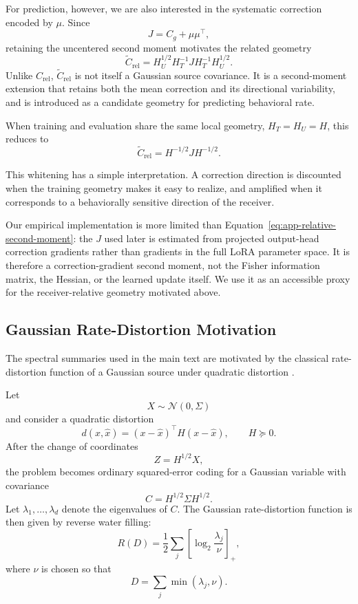 For prediction, however, we are also interested in the systematic correction
encoded by $\mu$. Since
\[
    J=C_g+\mu\mu^\top,
\]
retaining the uncentered second moment motivates the related geometry
\begin{equation}
    \widetilde C_{\mathrm{rel}}
    =
    H_U^{1/2}
    H_T^{-1}
    J
    H_T^{-1}
    H_U^{1/2}.
    \label{eq:app-relative-second-moment}
\end{equation}
Unlike $C_{\mathrm{rel}}$, $\widetilde C_{\mathrm{rel}}$ is not itself a
Gaussian source covariance. It is a second-moment extension that retains both
the mean correction and its directional variability, and is introduced as a
candidate geometry for predicting behavioral rate.

When training and evaluation share the same local geometry,
$H_T=H_U=H$, this reduces to
\begin{equation}
    \widetilde C_{\mathrm{rel}}
    =
    H^{-1/2}JH^{-1/2}.
    \label{eq:app-whitened-spectrum}
\end{equation}

This whitening has a simple interpretation.
A correction direction is discounted when the training geometry makes it easy
to realize, and amplified when it corresponds to a behaviorally sensitive
direction of the receiver.

Our empirical implementation is more limited than Equation~\ref{eq:app-relative-second-moment}: the $J$ used later is estimated from projected output-head correction gradients rather than gradients in the full LoRA parameter space.
It is therefore a correction-gradient second moment, not the Fisher information matrix, the Hessian, or the learned update itself.
We use it as an accessible proxy for the receiver-relative geometry motivated above.

\subsection{Gaussian Rate-Distortion Motivation}
\label{app:gaussian-rd}

The spectral summaries used in the main text are motivated by the classical
rate-distortion function of a Gaussian source under quadratic distortion
\citep[Ch.~10]{cover2006elements}.

Let
\[
    X\sim\mathcal{N}(0,\Sigma)
\]
and consider a quadratic distortion
\[
    d(x,\hat x)
    =
    (x-\hat x)^\top H(x-\hat x),
    \qquad H\succeq0.
\]
After the change of coordinates
\[
    Z=H^{1/2}X,
\]
the problem becomes ordinary squared-error coding for a Gaussian variable with
covariance
\[
    C=H^{1/2}\Sigma H^{1/2}.
\]
Let $\lambda_1,\ldots,\lambda_d$ denote the eigenvalues of $C$.
The Gaussian rate-distortion function is then given by reverse water filling:
\begin{equation}
    R(D)
    =
    \frac{1}{2}
    \sum_j
    \left[
        \log_2\frac{\lambda_j}{\nu}
    \right]_+,
    \label{eq:app-waterfilling}
\end{equation}
where $\nu$ is chosen so that
\[
    D
    =
    \sum_j\min(\lambda_j,\nu).
\]

